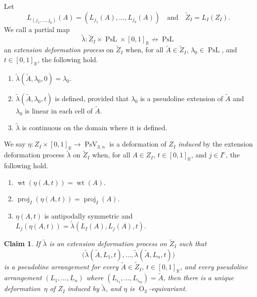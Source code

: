 \documentclass[11pt]{article}
\numberwithin{equation}{section}
\newtheorem{claim}[theorem]{Claim}
\theoremstyle{remark}
\let\mb\mathbb
\let\df\emph
\newcommand{\compl}[1]{{{#1}^{\text{c}}}}
\DeclareMathOperator{\wei}{wt}
\DeclareMathOperator{\orth}{O}
\DeclareMathOperator{\pstief}{PsV}
\DeclareMathOperator{\proj}{proj}
\DeclareMathOperator{\curves}{PsL}
\begin{document}
Let
\[
L_{(j_1,\dots,j_k)}(A) = (L_{j_1}(A),\dots,L_{j_k}(A))
\quad \text{and} \quad
\tilde Z_I = L_I(Z_I).
\]
We call a partial map
\[ \tilde \lambda : \tilde Z_I \times \curves \times [0,1]_\mb{R} \not\to \curves \]
an \df{extension deformation process} on $\tilde Z_I$ when, for all $\tilde A \in \tilde Z_I$, $\lambda_0 \in \curves$, and $t \in [0,1]_\mb{R}$, the following hold.
\begin{enumerate}
\item
$\tilde \lambda(\tilde A, \lambda_0, 0) = \lambda_0$.
\item
$\tilde \lambda(\tilde A, \lambda_0, t)$ is defined,
provided that $\lambda_0$ is a pseudoline extension of $\tilde A$ and $\lambda_0$ is linear in each cell of $\tilde A$.
\item
$\tilde \lambda$ is continuous on the domain where it is defined.
\end{enumerate}
We say $\eta: Z_I \times [0,1]_\mb{R} \to \pstief_{3,n}$ is a deformation of $Z_I$ \df{induced} by the extension deformation process $\tilde \lambda$ on $\tilde Z_I$ when, for all $A \in Z_I$, $t \in [0,1]_\mb{R}$, and $j \in \compl{I}$, the following hold.
\begin{enumerate}
\item
$\wei(\eta(A,t)) = \wei(A)$.
\item
$\proj_{I}(\eta(A,t)) = \proj_{I}(A)$.
\item
$\eta(A,t)$ is antipodally symmetric and $L_{j}(\eta(A,t)) = \tilde \lambda(L_I(A),L_j(A),t)$.
\end{enumerate}

\begin{claim}\label{claim-pseudoline-lift}
{If} $\tilde \lambda$ is an extension deformation process on $\tilde Z_I$ such that
\[ \bigl(\tilde \lambda(\tilde A, L_1, t),\dots,\tilde \lambda(\tilde A, L_{n}, t) \bigr) \]
is a pseudoline arrangement for every $\tilde A \in \tilde Z_I$, $t \in [0,1]_\mb{R}$, and every pseudoline arrangement $(L_1,\dots,L_n)$ where $(L_{i_1},\dots,L_{i_m}) = \tilde A$,
{then} there is a unique deformation~$\eta$ of $Z_I$ induced by $\tilde \lambda$, and $\eta$ is $\orth_3$-equivariant.
\end{claim}
\end{document}
